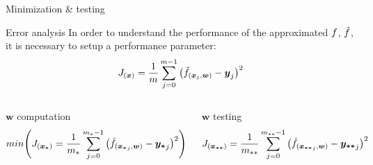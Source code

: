 \begin{frame}{Minimization \& testing}
    \begin{block}{Error analysis}
        In order to understand the performance of the approximated $\mathnormal{f}$, $\hat{\mathnormal{f}}$, it is necessary to setup a performance parameter:
        \begin{equation*}
            J_{(\boldsymbol{x})} = \frac{1}{m} \sum^{m-1}_{j = 0} \big( \hat{\mathnormal{f}}_{(\boldsymbol{x}_j, \boldsymbol{w})} - \boldsymbol{y}_j\big)^2
        \end{equation*}
    \end{block}
    \vspace{-0.5cm}
    \begin{columns}
        \begin{block}{$\boldsymbol{w}$ computation}
            \begin{equation*}
                min \Bigg( J_{(\boldsymbol{x_*})} = \frac{1}{m_*} \sum^{m_* - 1}_{j = 0} \big( \hat{\mathnormal{f}}_{(\boldsymbol{x_*}_j, \boldsymbol{w})} - \boldsymbol{y_*}_j\big)^2 \Bigg)
            \end{equation*}
        \end{block}
        \begin{block}{$\boldsymbol{w}$ testing}
            \begin{equation*}
                J_{(\boldsymbol{x_{**}})} = \frac{1}{m_{**}} \sum^{m_{**} - 1}_{j = 0} \big( \hat{\mathnormal{f}}_{(\boldsymbol{x_{**}}_j, \boldsymbol{w})} - \boldsymbol{y_{**}}_j\big)^2
            \end{equation*}
        \end{block}
    \end{columns}
\end{frame}

